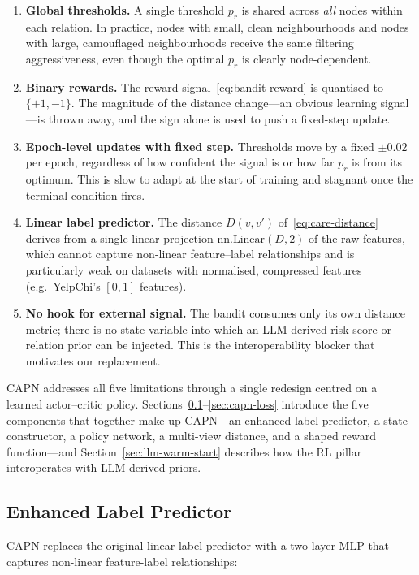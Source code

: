 \begin{enumerate}
    \item \textbf{Global thresholds.} A single threshold $p_r$ is shared across \emph{all} nodes within each relation. In practice, nodes with small, clean neighbourhoods and nodes with large, camouflaged neighbourhoods receive the same filtering aggressiveness, even though the optimal $p_r$ is clearly node-dependent.
    \item \textbf{Binary rewards.} The reward signal~\eqref{eq:bandit-reward} is quantised to $\{+1, -1\}$. The magnitude of the distance change---an obvious learning signal---is thrown away, and the sign alone is used to push a fixed-step update.
    \item \textbf{Epoch-level updates with fixed step.} Thresholds move by a fixed $\pm 0.02$ per epoch, regardless of how confident the signal is or how far $p_r$ is from its optimum. This is slow to adapt at the start of training and stagnant once the terminal condition fires.
    \item \textbf{Linear label predictor.} The distance $D(v, v')$ of~\eqref{eq:care-distance} derives from a single linear projection $\mathrm{nn.Linear}(D, 2)$ of the raw features, which cannot capture non-linear feature--label relationships and is particularly weak on datasets with normalised, compressed features (e.g.\ YelpChi's $[0,1]$ features).
    \item \textbf{No hook for external signal.} The bandit consumes only its own distance metric; there is no state variable into which an LLM-derived risk score or relation prior can be injected. This is the interoperability blocker that motivates our replacement.
\end{enumerate}

CAPN addresses all five limitations through a single redesign centred on a learned actor--critic policy. Sections~\ref{sec:capn-label-predictor}--\ref{sec:capn-loss} introduce the five components that together make up CAPN---an enhanced label predictor, a state constructor, a policy network, a multi-view distance, and a shaped reward function---and Section~\ref{sec:llm-warm-start} describes how the RL pillar interoperates with LLM-derived priors.

\subsection{Enhanced Label Predictor}
\label{sec:capn-label-predictor}

CAPN replaces the original linear label predictor with a two-layer MLP that captures non-linear feature-label relationships:

